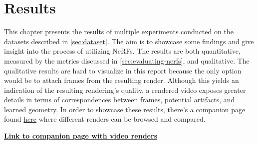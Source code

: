 \chapter{Results}

This chapter presents the results of multiple experiments conducted on the datasets described in \autoref{sec:dataset}. The aim is to showcase some findings and give insight into the process of utilizing NeRFs. The results are both quantitative, measured by the metrics discussed in \autoref{sec:evaluating-nerfs}, and qualitative. The qualitative results are hard to visualize in this report because the only option would be to attach frames from the resulting render. Although this yields an indication of the resulting rendering's quality, a rendered video exposes greater details in terms of correspondences between frames, potential artifacts, and learned geometry. In order to showcase these results, there's a companion page found \href{https://absorbing-peace-5f6.notion.site/NeRF-Renders-1260636ed8e44f8e8e4d45bd9fc6dda4#1edb5c8c9f86444db1902a18243b6e51}{here} where different renders can be browsed and compared.

\vspace{2mm} %
\noindent \textbf{\href{https://absorbing-peace-5f6.notion.site/NeRF-Renders-1260636ed8e44f8e8e4d45bd9fc6dda4\#1edb5c8c9f86444db1902a18243b6e51}{Link to companion page with video renders}}

